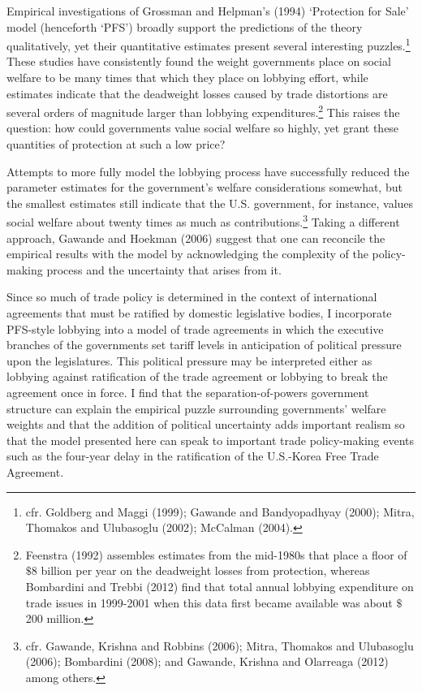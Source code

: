 \documentclass[10pt]{article}
\begin{document}
Empirical investigations of Grossman and Helpman's (1994) `Protection for Sale' model (henceforth `PFS') broadly support the predictions of the theory qualitatively, yet their quantitative estimates present several interesting puzzles.\footnote{cfr. Goldberg and Maggi (1999); Gawande and Bandyopadhyay (2000); Mitra, Thomakos and Ulubasoglu (2002); McCalman (2004).\label{fn:gh_lobby}} These studies have consistently found the weight governments place on social welfare to be many times that which they place on lobbying effort, while estimates indicate that the deadweight losses caused by trade distortions are several orders of magnitude larger than lobbying expenditures.\footnote{Feenstra (1992) assembles estimates from the mid-1980s that place a floor of $\$$8 billion per year on the deadweight losses from protection, whereas Bombardini and Trebbi (2012) find that total annual lobbying expenditure on trade issues in 1999-2001 when this data first became available was about $\$$200 million.} This raises the question: how could governments value social welfare so highly, yet grant these quantities of protection at such a low price?

Attempts to more fully model the lobbying process have successfully reduced the parameter estimates for the government's welfare considerations somewhat, but the smallest estimates still indicate that the U.S. government, for instance, values social welfare about twenty times as much as contributions.\footnote{cfr. Gawande, Krishna and Robbins (2006); Mitra, Thomakos and Ulubasoglu (2006); Bombardini (2008); and Gawande, Krishna and Olarreaga (2012) among others.} Taking a different approach, Gawande and Hoekman (2006) suggest that one can reconcile the empirical results with the model by acknowledging the complexity of the policy-making process and the uncertainty that arises from it.

Since so much of trade policy is determined in the context of international agreements that must be ratified by domestic legislative bodies, I incorporate PFS-style lobbying into a model of trade agreements in which the executive branches of the governments set tariff levels in anticipation of political pressure upon the legislatures. This political pressure may be interpreted either as lobbying against ratification of the trade agreement or lobbying to break the agreement once in force. I find that the separation-of-powers government structure can explain the empirical puzzle surrounding governments' welfare weights and that the addition of political uncertainty adds important realism so that the model presented here can speak to important trade policy-making events such as the four-year delay in the ratification of the U.S.-Korea Free Trade Agreement.
\end{document}
